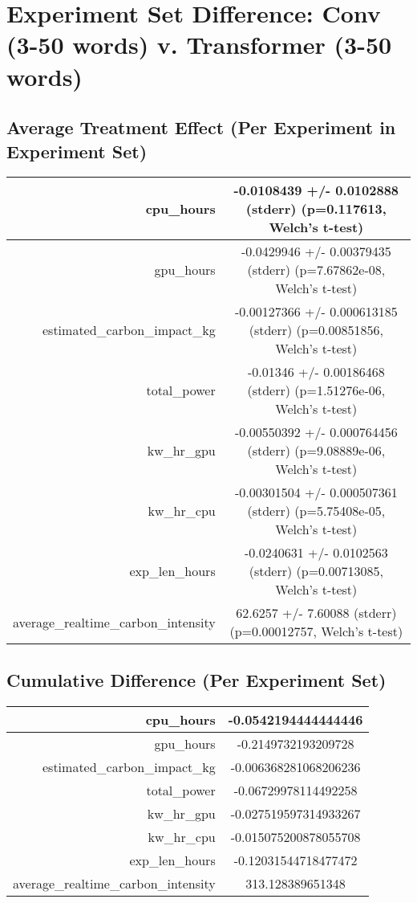 \documentclass{article}%
\begin{document}
%
\normalsize%
\section{Experiment Set Difference: Conv (3{-}50 words) v. Transformer (3{-}50 words)}%
\label{sec:Experiment Set Difference Conv (3{-}50 words) v. Transformer (3{-}50 words)}%
\subsection{Average Treatment Effect (Per Experiment in Experiment Set)}%
\label{subsec:Average Treatment Effect (Per Experiment in Experiment Set)}%
\begin{tabular}{|r|c|}%
\hline%
cpu\_hours&{-}0.0108439 +/{-} 0.0102888 (stderr) (p=0.117613, Welch's t{-}test)\\%
\hline%
gpu\_hours&{-}0.0429946 +/{-} 0.00379435 (stderr) (p=7.67862e{-}08, Welch's t{-}test)\\%
\hline%
estimated\_carbon\_impact\_kg&{-}0.00127366 +/{-} 0.000613185 (stderr) (p=0.00851856, Welch's t{-}test)\\%
\hline%
total\_power&{-}0.01346 +/{-} 0.00186468 (stderr) (p=1.51276e{-}06, Welch's t{-}test)\\%
\hline%
kw\_hr\_gpu&{-}0.00550392 +/{-} 0.000764456 (stderr) (p=9.08889e{-}06, Welch's t{-}test)\\%
\hline%
kw\_hr\_cpu&{-}0.00301504 +/{-} 0.000507361 (stderr) (p=5.75408e{-}05, Welch's t{-}test)\\%
\hline%
exp\_len\_hours&{-}0.0240631 +/{-} 0.0102563 (stderr) (p=0.00713085, Welch's t{-}test)\\%
\hline%
average\_realtime\_carbon\_intensity&62.6257 +/{-} 7.60088 (stderr) (p=0.00012757, Welch's t{-}test)\\%
\hline%
\end{tabular}

%
\subsection{Cumulative Difference (Per Experiment Set)}%
\label{subsec:Cumulative Difference (Per Experiment Set)}%
\begin{tabular}{|r|c|}%
\hline%
cpu\_hours&{-}0.0542194444444446\\%
\hline%
gpu\_hours&{-}0.2149732193209728\\%
\hline%
estimated\_carbon\_impact\_kg&{-}0.006368281068206236\\%
\hline%
total\_power&{-}0.06729978114492258\\%
\hline%
kw\_hr\_gpu&{-}0.027519597314933267\\%
\hline%
kw\_hr\_cpu&{-}0.015075200878055708\\%
\hline%
exp\_len\_hours&{-}0.12031544718477472\\%
\hline%
average\_realtime\_carbon\_intensity&313.128389651348\\%
\hline%
\end{tabular}

%
\end{document}
